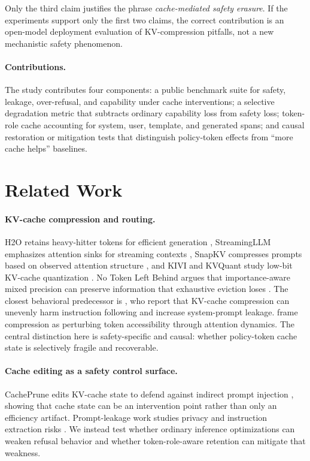 \documentclass[11pt]{article}
\begin{document}
Only the third claim justifies the phrase \emph{cache-mediated safety erasure}. If the experiments support only the first two claims, the correct contribution is an open-model deployment evaluation of KV-compression pitfalls, not a new mechanistic safety phenomenon.

\paragraph{Contributions.}
The study contributes four components: a public benchmark suite for safety, leakage, over-refusal, and capability under cache interventions; a selective degradation metric that subtracts ordinary capability loss from safety loss; token-role cache accounting for system, user, template, and generated spans; and causal restoration or mitigation tests that distinguish policy-token effects from ``more cache helps'' baselines.

\section{Related Work}

\paragraph{KV-cache compression and routing.}
H2O retains heavy-hitter tokens for efficient generation \citep{zhang2023h2o}, StreamingLLM emphasizes attention sinks for streaming contexts \citep{xiao2024streamingllm}, SnapKV compresses prompts based on observed attention structure \citep{li2024snapkv}, and KIVI and KVQuant study low-bit KV-cache quantization \citep{liu2024kivi,hooper2024kvquant}. No Token Left Behind argues that importance-aware mixed precision can preserve information that exhaustive eviction loses \citep{yang2024notoken}. The closest behavioral predecessor is \citet{chen2025pitfalls}, who report that KV-cache compression can unevenly harm instruction following and increase system-prompt leakage. \citet{ananthanarayanan2026physics} frame compression as perturbing token accessibility through attention dynamics. The central distinction here is safety-specific and causal: whether policy-token cache state is selectively fragile and recoverable.

\paragraph{Cache editing as a safety control surface.}
CachePrune edits KV-cache state to defend against indirect prompt injection \citep{wang2025cacheprune}, showing that cache state can be an intervention point rather than only an efficiency artifact. Prompt-leakage work studies privacy and instruction extraction risks \citep{hui2024pleak}. We instead test whether ordinary inference optimizations can weaken refusal behavior and whether token-role-aware retention can mitigate that weakness.
\end{document}
